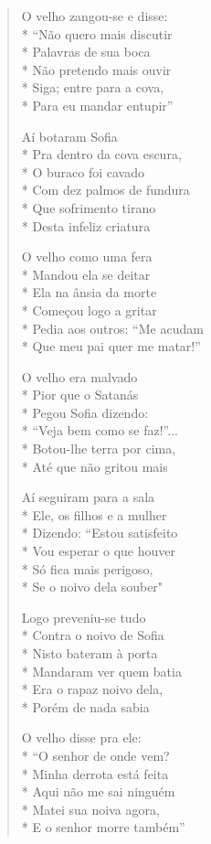 \begin{verse}
O velho zangou-se e disse:\\*
``Não quero mais discutir\\*
Palavras de sua boca\\*
Não pretendo mais ouvir\\*
Siga; entre para a cova,\\*
Para eu mandar entupir''

Aí botaram Sofia\\*
Pra dentro da cova escura,\\*
O buraco foi cavado\\*
Com dez palmos de fundura\\*
Que sofrimento tirano\\*
Desta infeliz criatura

O velho como uma fera\\*
Mandou ela se deitar\\*
Ela na ânsia da morte\\*
Começou logo a gritar\\*
Pedia aos outros: ``Me acudam\\*
Que meu pai quer me matar!''

O velho era malvado\\*
Pior que o Satanás\\*
Pegou Sofia dizendo:\\*
``Veja bem como se faz!''...\\*
Botou-lhe terra por cima,\\*
Até que não gritou mais

Aí seguiram para a sala\\*
Ele, os filhos e a mulher\\*
Dizendo: ``Estou satisfeito\\*
Vou esperar o que houver\\*
Só fica mais perigoso,\\*
Se o noivo dela souber"

Logo preveniu-se tudo\\*
Contra o noivo de Sofia\\*
Nisto bateram à porta\\*
Mandaram ver quem batia\\*
Era o rapaz noivo dela,\\*
Porém de nada sabia

O velho disse pra ele:\\*
``O senhor de onde vem?\\*
Minha derrota está feita\\*
Aqui não me sai ninguém\\*
Matei sua noiva agora,\\*
E o senhor morre também''


\end{verse}
